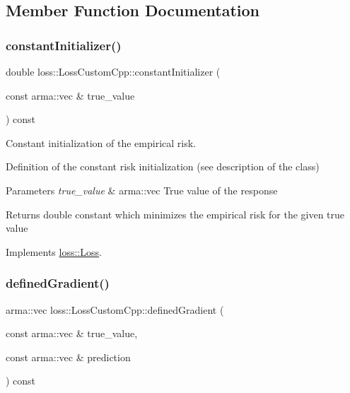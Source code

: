 \subsection{Member Function Documentation}
\mbox{\label{classloss_1_1_loss_custom_cpp_af6d7652231c313abe11009e44b51d0b1}} 
\subsubsection{\texorpdfstring{constant\+Initializer()}{constantInitializer()}}
{\footnotesize\ttfamily double loss\+::\+Loss\+Custom\+Cpp\+::constant\+Initializer (\begin{DoxyParamCaption}\item[{const arma\+::vec \&}]{true\+\_\+value }\end{DoxyParamCaption}) const\hspace{0.3cm}{\ttfamily [virtual]}}



Constant initialization of the empirical risk. 

Definition of the constant risk initialization (see description of the class)


\begin{DoxyParams}{Parameters}
{\em true\+\_\+value} & {\ttfamily arma\+::vec} True value of the response\\
\hline
\end{DoxyParams}
\begin{DoxyReturn}{Returns}
{\ttfamily double} constant which minimizes the empirical risk for the given true value 
\end{DoxyReturn}


Implements \hyperlink{classloss_1_1_loss_a65fe7dcd9370e6a549b8d1cc95fc8798}{loss\+::\+Loss}.

\mbox{\label{classloss_1_1_loss_custom_cpp_a8db4924e9a9866c00adf4a8cfd3ec38a}} 
\subsubsection{\texorpdfstring{defined\+Gradient()}{definedGradient()}}
{\footnotesize\ttfamily arma\+::vec loss\+::\+Loss\+Custom\+Cpp\+::defined\+Gradient (\begin{DoxyParamCaption}\item[{const arma\+::vec \&}]{true\+\_\+value,  }\item[{const arma\+::vec \&}]{prediction }\end{DoxyParamCaption}) const\hspace{0.3cm}{\ttfamily [virtual]}}



